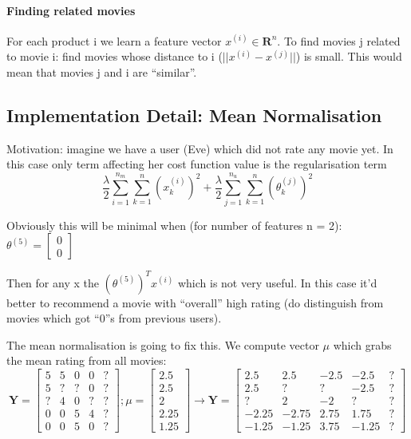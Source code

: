\documentclass{scrartcl}
\begin{document}
\paragraph{Finding related movies}

For each product i we learn a feature vector $x^{(i)} \in
\mathbf{R}^n$. To find movies j related to movie i: find movies whose
distance to i ($||x^{(i)} - x^{(j)}||$) is small. This would mean that
movies j and i are ``similar''.

\subsection{Implementation Detail: Mean Normalisation}
\label{sec:16-6}

Motivation: imagine we have a user (Eve) which did not rate any movie
yet. In this case only term affecting her cost function value is the
regularisation term \[\frac{\lambda}{2} \sum \limits_{i=1}^{n_m} \sum
\limits_{k=1}^n(x_k^{(i)})^2 + \frac{\lambda}{2} \sum
\limits_{j=1}^{n_u} \sum \limits_{k=1}^n (\theta_k^{(j)})^2\]

Obviously this will be minimal when (for number of features n = 2):
$\theta^{(5)} = \left[ \begin{array}{c} 0 \\ 0 \end{array} \right]$

Then for any x the $(\theta^{(5)})^T x^{(i)}$ which is not very
useful. In this case it'd better to recommend a movie with ``overall''
high rating (do distinguish from movies which got ``0''s from previous
users).

The mean normalisation is going to fix this. We compute vector $\mu$
which grabs the mean rating from all movies:
\[ \mathbf{Y} = \left[
  \begin{array}{ccccc}
    5 & 5 & 0 & 0 & ?\\
    5 & ? & ? & 0 & ? \\
    ? & 4 & 0 & ? & ? \\
    0 & 0 & 5 & 4 & ? \\
    0 & 0 & 5 & 0 & ?
  \end{array} \right]; 
\mu = \left[\begin{array}{c}  2.5 \\ 2.5 \\ 2 \\ 2.25 \\
    1.25\end{array}\right]  \to
\mathbf{Y} = \left[ 
  \begin{array}{ccccc}
    2.5 & 2.5 & -2.5 & -2.5 & ? \\
    2.5 & ? & ? & -2.5 & ? \\
    ? & 2 & -2 & ? & ? \\
    -2.25 & -2.75 & 2.75 & 1.75 & ? \\
    -1.25 & -1.25 & 3.75 & -1.25  & ?
  \end{array} \right]
\]
\end{document}
